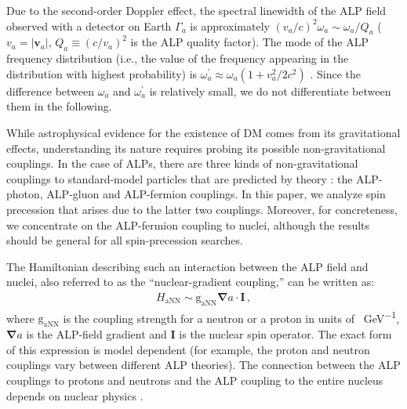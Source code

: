 \documentclass{WileyMSP-template}
\newcommand{\DB}[1]{\textcolor{blue}{#1}}
\newcommand{\YZ}[1]{\textcolor{purple}{Yuzhe: #1}}
\newcommand{\AW}[1]{\textcolor{cyan}{Arne: #1}}
\begin{document}
	Due to the second-order Doppler effect, the spectral linewidth of the ALP field observed with a detector on Earth $\Gamma_a$ is approximately $(v_a/c)^2\omega_a \sim \omega_a/Q_a$ \cite{Gramolin2022_SpectralPhysRevD} ($v_a = |\mathbf{v}_a|$, $Q_a \equiv (c/v_a)^2$ is the ALP quality factor). 
	The mode of the ALP frequency distribution (i.e., the value of the frequency appearing in the distribution with highest probability) is $\omega_a^{'}\approx\omega_a(1+v_a^2/2c^2)$ \cite{KimballOverview}. Since the difference between $\omega_a$ and $\omega_a^{'}$ is relatively small, we do not differentiate between them in the following. 

	
	
	While astrophysical evidence for the existence of DM comes from its gravitational effects, understanding its nature requires probing its possible non-gravitational couplings.
	In the case of ALPs, there are three kinds of non-gravitational couplings to standard-model particles that are predicted by theory \cite{GrahamNewobservables_PhysRevD.88.035023}: the ALP-photon, ALP-gluon and ALP-fermion couplings.
	In this paper, we analyze spin precession that arises due to the latter two couplings. Moreover, for concreteness, we concentrate on the ALP-fermion coupling to nuclei, although the results should be general for all spin-precession searches. 

	The Hamiltonian describing such an interaction between the ALP field and nuclei, also referred to as the ``nuclear-gradient coupling,'' can be written as:
	\begin{align}
		H_{\mathrm{aNN}} \sim \mathrm{g_{aNN}} {\boldsymbol \nabla} a \cdot \mathbf{I} 
		\,,\label{eq:HaNN}
	\end{align}
	where $\mathrm{g_{aNN}}$ is the coupling strength for a neutron or a proton in units of \SI{}{\GeV^{-1}}, ${\boldsymbol \nabla} a$ is the ALP-field gradient and $\mathbf{I}$ is the nuclear spin operator. The exact form of this expression is model dependent (for example, the proton and neutron couplings vary between different ALP theories). The connection between the ALP couplings to protons and neutrons and the ALP coupling to the entire nucleus depends
	on nuclear physics \cite{Kimball_2015_spin}.
\end{document}
